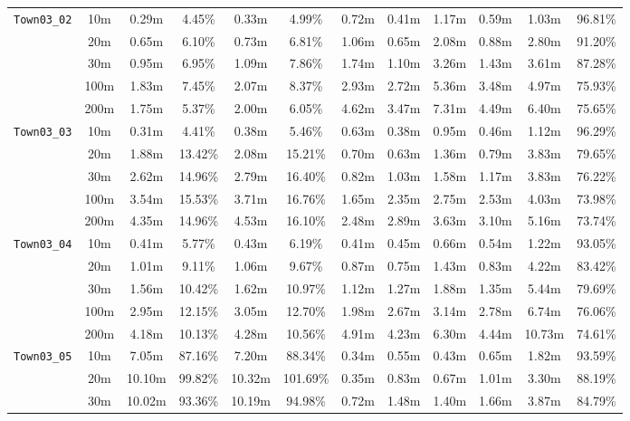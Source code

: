 \begin{table}
{\begin{tabular}{@{}cccccccccccc@{}}
      \midrule
      \multirow{5}{*}{\Verb|Town03_02|} & 10m & 0.29m & 4.45\% & 0.33m & 4.99\% & 0.72m & 0.41m & 1.17m & 0.59m & 1.03m & 96.81\% \\
      & 20m & 0.65m & 6.10\% & 0.73m & 6.81\% & 1.06m & 0.65m & 2.08m & 0.88m & 2.80m & 91.20\% \\
      & 30m & 0.95m & 6.95\% & 1.09m & 7.86\% & 1.74m & 1.10m & 3.26m & 1.43m & 3.61m & 87.28\% \\
      & 100m & 1.83m & 7.45\% & 2.07m & 8.37\% & 2.93m & 2.72m & 5.36m & 3.48m & 4.97m & 75.93\% \\
      & 200m & 1.75m & 5.37\% & 2.00m & 6.05\% & 4.62m & 3.47m & 7.31m & 4.49m & 6.40m & 75.65\% \\
      \midrule
      \multirow{5}{*}{\Verb|Town03_03|} & 10m & 0.31m & 4.41\% & 0.38m & 5.46\% & 0.63m & 0.38m & 0.95m & 0.46m & 1.12m & 96.29\% \\
      & 20m & 1.88m & 13.42\% & 2.08m & 15.21\% & 0.70m & 0.63m & 1.36m & 0.79m & 3.83m & 79.65\% \\
      & 30m & 2.62m & 14.96\% & 2.79m & 16.40\% & 0.82m & 1.03m & 1.58m & 1.17m & 3.83m & 76.22\% \\
      & 100m & 3.54m & 15.53\% & 3.71m & 16.76\% & 1.65m & 2.35m & 2.75m & 2.53m & 4.03m & 73.98\% \\
      & 200m & 4.35m & 14.96\% & 4.53m & 16.10\% & 2.48m & 2.89m & 3.63m & 3.10m & 5.16m & 73.74\% \\
      \midrule
      \multirow{5}{*}{\Verb|Town03_04|} & 10m & 0.41m & 5.77\% & 0.43m & 6.19\% & 0.41m & 0.45m & 0.66m & 0.54m & 1.22m & 93.05\% \\
      & 20m & 1.01m & 9.11\% & 1.06m & 9.67\% & 0.87m & 0.75m & 1.43m & 0.83m & 4.22m & 83.42\% \\
      & 30m & 1.56m & 10.42\% & 1.62m & 10.97\% & 1.12m & 1.27m & 1.88m & 1.35m & 5.44m & 79.69\% \\
      & 100m & 2.95m & 12.15\% & 3.05m & 12.70\% & 1.98m & 2.67m & 3.14m & 2.78m & 6.74m & 76.06\% \\
      & 200m & 4.18m & 10.13\% & 4.28m & 10.56\% & 4.91m & 4.23m & 6.30m & 4.44m & 10.73m & 74.61\% \\
      \midrule
      \multirow{5}{*}{\Verb|Town03_05|} & 10m & 7.05m & 87.16\% & 7.20m & 88.34\% & 0.34m & 0.55m & 0.43m & 0.65m & 1.82m & 93.59\% \\
      & 20m & 10.10m & 99.82\% & 10.32m & 101.69\% & 0.35m & 0.83m & 0.67m & 1.01m & 3.30m & 88.19\% \\
      & 30m & 10.02m & 93.36\% & 10.19m & 94.98\% & 0.72m & 1.48m & 1.40m & 1.66m & 3.87m & 84.79\% \\

\end{tabular}}
\end{table}
